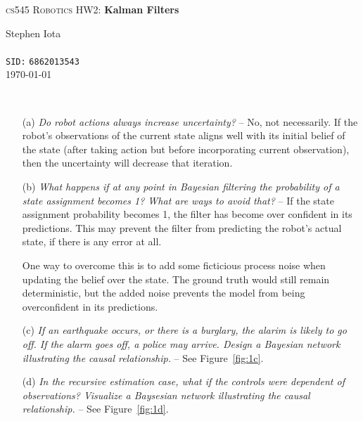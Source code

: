 \documentclass{article}
\begin{document}
    \begin{center}
        {\LARGE \textsc{cs545 Robotics HW2:} \textbf{Kalman Filters}}
    \end{center}

    \bigbreak

    \begin{center}
        Stephen Iota%
        \\
        \\
        \texttt{SID:} \texttt{6862013543}
        \\
        \today
    \end{center}

    \bigbreak

    \begin{question}
        ~%
        \begin{enumerate}
            \item[(a)] \textit{Do robot actions always increase uncertainty?}  -- No, not necessarily. If the robot's observations of the current state aligns well with its initial belief of the state (after taking action but before incorporating current observation), then the uncertainty will decrease that iteration.

            \item[(b)] \textit{What happens if at any point in Bayesian filtering the probability of a state assignment becomes 1? What are ways to avoid that?} -- If the state assignment probability becomes 1, the filter has become over confident in its predictions. This may prevent the filter from predicting the robot's actual state, if there is any error at all. 

            One way to overcome this is to add some ficticious process noise when updating the belief over the state. The ground truth would still remain deterministic, but the added noise prevents the model from being overconfident in its predictions. 
            
            \item[(c)] \textit{If an earthquake occurs, or there is a burglary, the alarim is likely to go off. If the alarm goes off, a police may arrive. Design a Bayesian network illustrating the causal relationship.} -- See Figure~\ref{fig:1c}.

            \item[(d)] \textit{In the recursive estimation case, what if the controls were dependent of observations? Visualize a Baysesian network illustrating the causal relationship.} -- See Figure~\ref{fig:1d}.


\end{enumerate}
\end{question}
\end{document}
